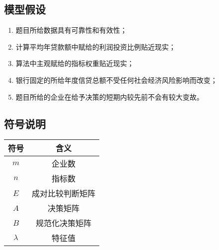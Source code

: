 \documentclass{cumcmthesis}
\begin{document}
\subsection{模型假设}
\begin{enumerate}
	\item 题目所给数据具有可靠性和有效性；
	\item 计算平均年贷款额中赋给的利润投资比例贴近现实；
	\item 算法中主观赋给的指标权重贴近现实；
	\item 银行固定的所给年度信贷总额不受任何社会经济风险影响而改变；
	\item 题目所给的企业在给予决策的短期内较先前不会有较大变故。
\end{enumerate}

\let\cleardoublepage\clearpage

\subsection{符号说明}
\begin{table}[H]   %
 \centering
	\begin{tabular}{cc}
		\toprule[1.5pt]
		符号 & 含义\\
		\midrule[1pt]
		$m$ & 企业数\\
		$n$ & 指标数\\
		$E$ & 成对比较判断矩阵\\
		$A$ & 决策矩阵\\
		$B$ & 规范化决策矩阵\\
		$\lambda$ & 特征值\\
		\bottomrule[1.5pt]
\end{tabular}
\end{table}	
\end{document}
